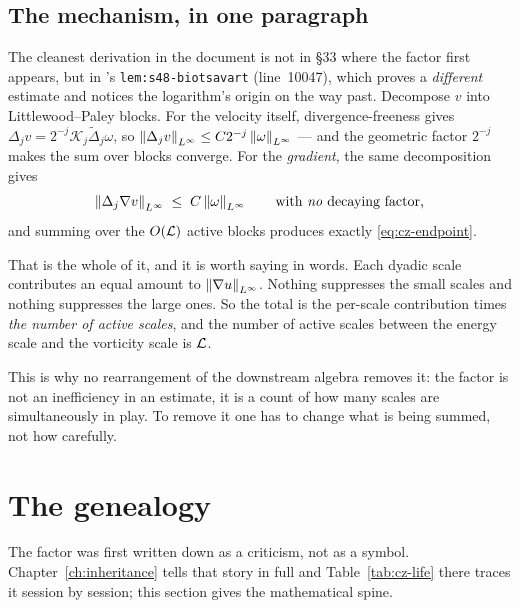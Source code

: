 \subsection{The mechanism, in one paragraph}

The cleanest derivation in the document is not in \S33 where the factor first
appears, but in 's \texttt{lem:s48-biotsavart} (line~10047), which
proves a \emph{different} estimate and notices the logarithm's origin on the
way past. Decompose \(v\) into Littlewood--Paley blocks. For the velocity
itself, divergence-freeness gives
\(\Delta_j v = 2^{-j}\mathcal{K}_j\widetilde\Delta_j\omega\), so
\(\left\|\Delta_j v\right\|_{L^\infty}\le C2^{-j}\left\|\omega\right\|_{L^\infty}\) --- and
the geometric factor \(2^{-j}\) makes the sum over blocks converge. For the
\emph{gradient}, the same decomposition gives
\[
  \left\|\Delta_j\nabla v\right\|_{L^\infty} \;\le\; C\left\|\omega\right\|_{L^\infty}
  \qquad\text{with \emph{no} decaying factor,}
\]
and summing over the \(O(\mathcal{L})\) active blocks produces exactly
\eqref{eq:cz-endpoint}.

\begin{obsv}
\label{obs:log-counts-scales}
That is the whole of it, and it is worth saying in words. Each dyadic scale
contributes an equal amount to \(\left\|\nabla u\right\|_{L^\infty}\). Nothing
suppresses the small scales and nothing suppresses the large ones. So the
total is the per-scale contribution times \emph{the number of active scales},
and the number of active scales between the energy scale and the vorticity
scale is \(\mathcal{L}\).

\smallskip
This is why no rearrangement of the downstream algebra removes it: the factor
is not an inefficiency in an estimate, it is a count of how many scales are
simultaneously in play. To remove it one has to change what is being summed,
not how carefully.
\end{obsv}

\section{The genealogy}
\label{sec:cz-genealogy}

The factor was first written down as a criticism, not as a symbol.
Chapter~\ref{ch:inheritance} tells that story in full and
Table~\ref{tab:cz-life} there traces it session by session; this section gives
the mathematical spine.

